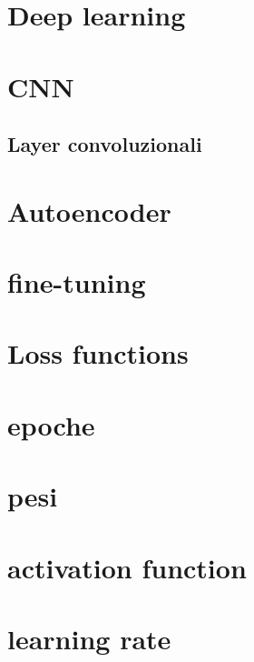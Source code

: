 \section{Deep learning}

\section{CNN}
\subsection{Layer convoluzionali}

\section{Autoencoder}

\section{fine-tuning}


\section{Loss functions}
\section{epoche}
\section{pesi}
\section{activation function}
\section{learning rate}





